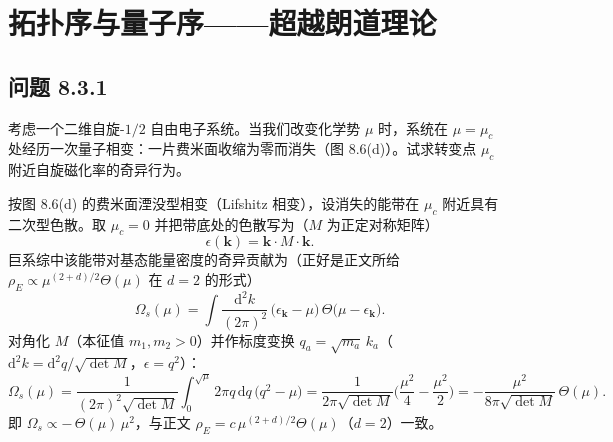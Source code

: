 \chapter{拓扑序与量子序——超越朗道理论}

\section*{问题 8.3.1}
\begin{problem}
考虑一个二维自旋-$1/2$ 自由电子系统。当我们改变化学势 $\mu$ 时，系统在 $\mu=\mu_c$ 处经历一次量子相变：一片费米面收缩为零而消失（图 8.6(d)）。试求转变点 $\mu_c$ 附近自旋磁化率的奇异行为。
\end{problem}
\solution
按图 8.6(d) 的费米面湮没型相变（Lifshitz 相变），设消失的能带在 $\mu_c$ 附近具有二次型色散。取 $\mu_c=0$ 并把带底处的色散写为（$M$ 为正定对称矩阵）
\begin{equation*}
\epsilon(\pmb{k})=\pmb{k}\cdot M\cdot\pmb{k}.
\end{equation*}
巨系综中该能带对基态能量密度的奇异贡献为（正好是正文所给 $\rho_E\propto\mu^{(2+d)/2}\Theta(\mu)$ 在 $d=2$ 的形式）
\begin{equation*}
\varOmega_s(\mu)=\int\frac{\mathrm{d}^2k}{(2\pi)^2}\,\big(\epsilon_{\pmb{k}}-\mu\big)\,\Theta\big(\mu-\epsilon_{\pmb{k}}\big).
\end{equation*}
对角化 $M$（本征值 $m_1,m_2>0$）并作标度变换 $q_a=\sqrt{m_a}\,k_a$（$\mathrm{d}^2k=\mathrm{d}^2q/\sqrt{\det M}$，$\epsilon=q^2$）：
\begin{equation*}
\varOmega_s(\mu)=\frac{1}{(2\pi)^2\sqrt{\det M}}\int_0^{\sqrt{\mu}}2\pi q\,\mathrm{d}q\,\big(q^2-\mu\big)
=\frac{1}{2\pi\sqrt{\det M}}\Big(\frac{\mu^2}{4}-\frac{\mu^2}{2}\Big)
=-\frac{\mu^2}{8\pi\sqrt{\det M}}\,\Theta(\mu).
\end{equation*}
即 $\varOmega_s\propto-\,\Theta(\mu)\,\mu^{2}$，与正文 $\rho_E=c\,\mu^{(2+d)/2}\Theta(\mu)$（$d=2$）一致。

